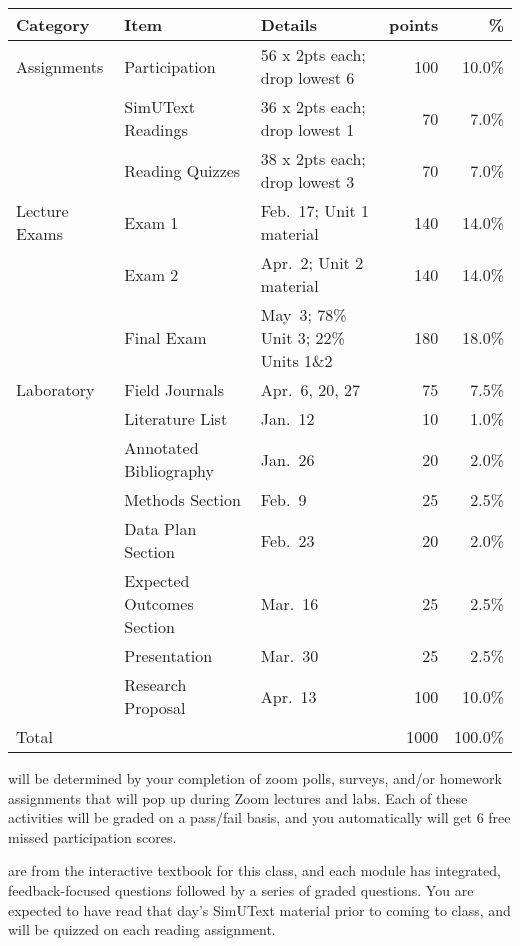\documentclass{tufte-handout}
\begin{document}
\begin{fullwidth}

\begin{table}
\begin{tabular}{l l l r r}
Category & Item & Details & points & \% \\
\hline
Assignments & Participation & 56 x 2pts each; drop lowest 6 & 100 & 10.0\% \\
& SimUText Readings   & 36 x 2pts each; drop lowest 1 & 70 & 7.0\% \\
& Reading Quizzes  & 38 x 2pts each; drop lowest 3 & 70 & 7.0\% \\
\hline
Lecture Exams & Exam 1 & Feb.~17; Unit 1 material & 140 & 14.0\% \\
& Exam 2 & Apr.~2; Unit 2 material & 140 & 14.0\% \\
& Final Exam & May~3; 78\% Unit 3; 22\% Units 1\&2 & 180 & 18.0\% \\ 		
\hline
Laboratory & Field Journals & Apr.~6, 20, 27 & 75 & 7.5\% \\
& Literature List & Jan.~12 & 10 & 1.0\% \\
& Annotated Bibliography & Jan.~26 & 20 & 2.0\% \\
& Methods Section & Feb.~9 & 25 & 2.5\% \\
& Data Plan Section & Feb.~23 & 20 & 2.0\% \\
& Expected Outcomes Section & Mar.~16 & 25 & 2.5\% \\
& Presentation & Mar.~30 & 25 & 2.5\% \\
& Research Proposal & Apr.~13 & 100 & 10.0\% \\
\hline
Total & & & 1000 & 100.0\% 
\end{tabular}
\end{table}




 will be determined by your completion of zoom polls, surveys, and/or homework assignments that will pop up during Zoom lectures and labs. Each of these activities will be graded on a pass/fail basis, and you automatically will get 6 free missed participation scores. 


\end{fullwidth}

 are from the interactive textbook for this class, and each module has integrated, feedback-focused questions followed by a series of graded questions. \color{blue}You are expected to have read that day's SimUText material prior to coming to class, and will be quizzed on each reading assignment. \color{black} 
\end{document}
